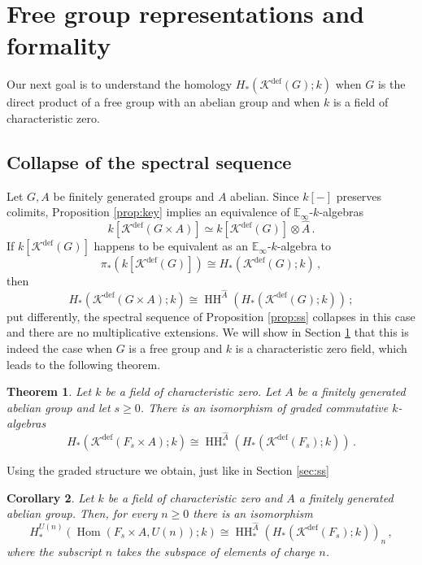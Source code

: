 \documentclass[oneside, a4paper, 12pt]{article}
\numberwithin{equation}{section}
\DeclareMathOperator{\Hom}{Hom}
\DeclareMathOperator{\HH}{HH}
\newcommand{\Kdef}{\mathcal{K}^{\mathrm{def}}}
\theoremstyle{plain}
\newtheorem{theorem}{Theorem}[section]
\newtheorem{corollary}[theorem]{Corollary}
\theoremstyle{definition}
\theoremstyle{remark}
\begin{document}

\section{Free group representations and formality} \label{sec:formality}

Our next goal is to understand the homology $H_\ast(\Kdef(G);k)$ when $G$ is the direct product of a free group with an abelian group and when $k$ is a field of characteristic zero.


\subsection{Collapse of the spectral sequence} \label{sec:hh}

Let $G,A$ be finitely generated groups and $A$ abelian. Since $k[-]$ preserves colimits, Proposition \ref{prop:key} implies an equivalence of $\mathbb{E}_\infty$-$k$-algebras
\[
k[\Kdef(G\times A)] \simeq k[\Kdef(G)]\otimes \widehat{A}\, .
\]
If $k[\Kdef(G)]$ happens to be equivalent as an $\mathbb{E}_\infty$-$k$-algebra to
\[
\pi_\ast(k[\Kdef(G)]) \cong H_\ast(\Kdef(G);k)\,,
\]
then
\[
H_\ast(\Kdef(G\times A);k) \cong \HH^{\widehat{A}}(H_\ast(\Kdef(G);k))\, ;
\]
put differently, the spectral sequence of Proposition \ref{prop:ss} collapses in this case and there are no multiplicative extensions. We will show in Section \ref{sec:formality} that this is indeed the case when $G$ is a free group and $k$ is a characteristic zero field, which leads to the following theorem.



\begin{theorem} \label{thm:hh}
Let $k$ be a field of characteristic zero. Let $A$ be a finitely generated abelian group and let $s\geq 0$. There is an isomorphism of graded commutative $k$-algebras
\[
H_\ast(\Kdef(F_s\times A);k)\cong \HH^{\widehat{A}}_\ast(H_\ast(\Kdef(F_s);k))\, .
\]
\end{theorem}

Using the graded structure we obtain, just like in Section \ref{sec:ss}


\begin{corollary} \label{cor:hh}
Let $k$ be a field of characteristic zero and $A$ a finitely generated abelian group. Then, for every $n\geq 0$ there is an isomorphism
\[
H_\ast^{U(n)}(\Hom(F_s\times A,U(n));k)\cong \HH^{\widehat{A}}_{\ast}(H_\ast(\Kdef(F_s);k))_n\, ,
\]
where the subscript $n$ takes the subspace of elements of charge $n$.
\end{corollary}
\end{document}
